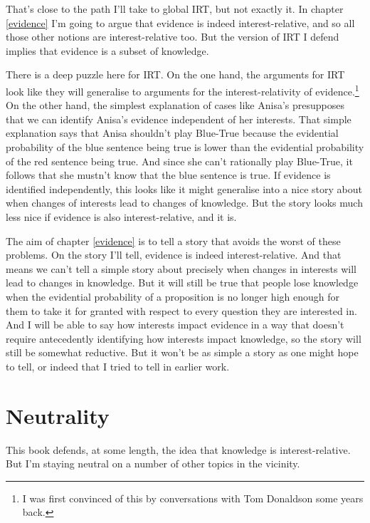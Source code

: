 \documentclass[
  11pt,
]{book}
\begin{document}
That's close to the path I'll take to global IRT, but not exactly it. In chapter \ref{evidence} I'm going to argue that evidence is indeed interest-relative, and so all those other notions are interest-relative too. But the version of IRT I defend implies that evidence is a subset of knowledge.

There is a deep puzzle here for IRT. On the one hand, the arguments for IRT look like they will generalise to arguments for the interest-relativity of evidence.\footnote{I was first convinced of this by conversations with Tom Donaldson some years back.} On the other hand, the simplest explanation of cases like Anisa's presupposes that we can identify Anisa's evidence independent of her interests. That simple explanation says that Anisa shouldn't play Blue-True because the evidential probability of the blue sentence being true is lower than the evidential probability of the red sentence being true. And since she can't rationally play Blue-True, it follows that she mustn't know that the blue sentence is true. If evidence is identified independently, this looks like it might generalise into a nice story about when changes of interests lead to changes of knowledge. But the story looks much less nice if evidence is also interest-relative, and it is.

The aim of chapter \ref{evidence} is to tell a story that avoids the worst of these problems. On the story I'll tell, evidence is indeed interest-relative. And that means we can't tell a simple story about precisely when changes in interests will lead to changes in knowledge. But it will still be true that people lose knowledge when the evidential probability of a proposition is no longer high enough for them to take it for granted with respect to every question they are interested in. And I will be able to say how interests impact evidence in a way that doesn't require antecedently identifying how interests impact knowledge, so the story will still be somewhat reductive. But it won't be as simple a story as one might hope to tell, or indeed that I tried to tell in earlier work.

\hypertarget{neutrality}{%
\section{Neutrality}\label{neutrality}}

This book defends, at some length, the idea that knowledge is interest-relative. But I'm staying neutral on a number of other topics in the vicinity.
\end{document}
